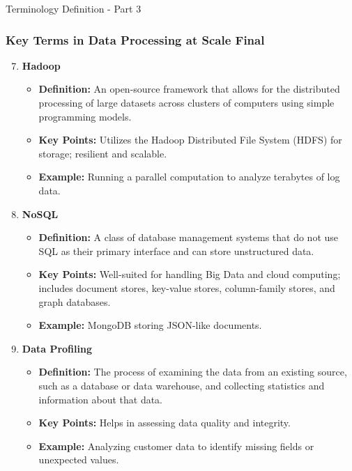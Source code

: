 \documentclass[aspectratio=169]{beamer}
\begin{document}
\begin{frame}[fragile]{Terminology Definition - Part 3}
    \frametitle{Key Terms in Data Processing at Scale Final}
    \begin{enumerate}
        \setcounter{enumi}{6} %
        \item \textbf{Hadoop}
        \begin{itemize}
            \item \textbf{Definition:} An open-source framework that allows for the distributed processing of large datasets across clusters of computers using simple programming models.
            \item \textbf{Key Points:} Utilizes the Hadoop Distributed File System (HDFS) for storage; resilient and scalable.
            \item \textbf{Example:} Running a parallel computation to analyze terabytes of log data.
        \end{itemize}

        \item \textbf{NoSQL}
        \begin{itemize}
            \item \textbf{Definition:} A class of database management systems that do not use SQL as their primary interface and can store unstructured data.
            \item \textbf{Key Points:} Well-suited for handling Big Data and cloud computing; includes document stores, key-value stores, column-family stores, and graph databases.
            \item \textbf{Example:} MongoDB storing JSON-like documents.
        \end{itemize}

        \item \textbf{Data Profiling}
        \begin{itemize}
            \item \textbf{Definition:} The process of examining the data from an existing source, such as a database or data warehouse, and collecting statistics and information about that data.
            \item \textbf{Key Points:} Helps in assessing data quality and integrity.
            \item \textbf{Example:} Analyzing customer data to identify missing fields or unexpected values.
        \end{itemize}


\end{enumerate}
\end{frame}
\end{document}
